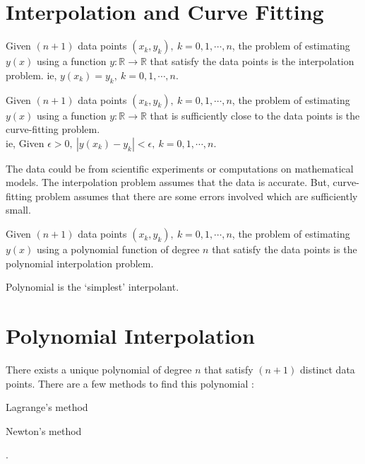 \section{Interpolation and Curve Fitting}
\begin{definition}
	Given $(n+1)$ data points $(x_k, y_k),\ k = 0,1,\cdots,n$, the problem of estimating $y(x)$ using a function $y : \mathbb{R} \to \mathbb{R}$ that satisfy the data points is the interpolation problem.
	ie, $y(x_k) = y_k,\ k = 0,1,\cdots,n$.
\end{definition}
\begin{definition}
	Given $(n+1)$ data points $(x_k,y_k),\ k = 0,1,\cdots,n$, the problem of estimating $y(x)$ using a function $y : \mathbb{R} \to \mathbb{R}$ that is sufficiently close to the data points is the curve-fitting problem.\\
	ie, Given $\epsilon > 0,\ |y(x_k)-y_k| < \epsilon,\ k = 0,1,\cdots,n$.
\end{definition}
\begin{remark}
\begin{commentary}
The data could be from scientific experiments or computations on mathematical models.
	The interpolation problem assumes that the data is accurate.
	But, curve-fitting problem assumes that there are some errors involved which are sufficiently small.
\end{commentary}
\end{remark}
\begin{definition}
	Given $(n+1)$ data points $(x_k,y_k),\ k = 0,1,\cdots,n$, the problem of estimating $y(x)$ using a polynomial function of degree $n$ that satisfy the data points is the polynomial interpolation problem.
\end{definition}
\begin{remark}
	Polynomial is the `simplest' interpolant.
	\cite[3.2]{kiusalaas}
\end{remark}

\section{Polynomial Interpolation}
There exists a unique polynomial of degree $n$ that satisfy $(n+1)$ distinct data points.
There are a few methods to find this polynomial : 
\begin{enumerate*}
	\item Lagrange's method
	\item Newton's method
\end{enumerate*}.

